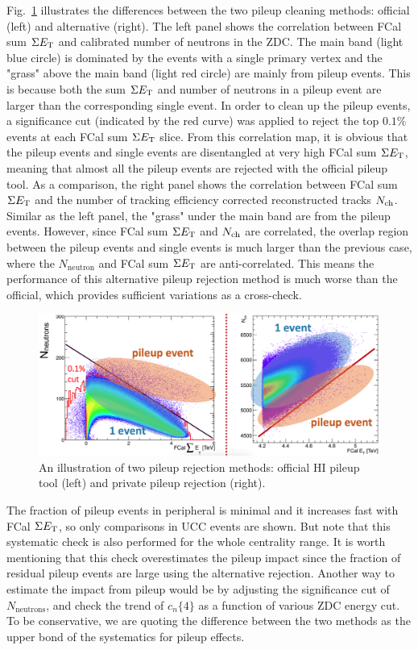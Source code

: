 Fig.~\ref{fig:appendix_pileup_eg} illustrates the differences between the two pileup cleaning methods: official (left) and alternative (right). The left panel shows the correlation between FCal sum $\Sigma E_\text{T}$ and calibrated number of neutrons in the ZDC. The main band (light blue circle) is dominated by the events with a single primary vertex and the "grass" above the main band (light red circle) are mainly from pileup events. This is because both the sum $\Sigma E_\text{T}$ and number of neutrons in a pileup event are larger than the corresponding single event. In order to clean up the pileup events, a significance cut (indicated by the red curve) was applied to reject the top $0.1\%$ events at each FCal sum $\Sigma E_\text{T}$ slice. From this correlation map, it is obvious that the pileup events and single events are disentangled at very high FCal sum $\Sigma E_\text{T}$, meaning that almost all the pileup events are rejected with the official pileup tool. As a comparison, the right panel shows the correlation between FCal sum $\Sigma E_\text{T}$ and the number of tracking efficiency corrected reconstructed tracks $N_\text{ch}$. Similar as the left panel, the "grass" under the main band are from the pileup events. However, since FCal sum $\Sigma E_\text{T}$ and $N_\text{ch}$ are correlated, the overlap region between the pileup events and single events is much larger than the previous case, where the $N_\text{neutron}$ and FCal sum $\Sigma E_\text{T}$ are anti-correlated. This means the performance of this alternative pileup rejection method is much worse than the official, which provides sufficient variations as a cross-check.
\begin{figure}[H]
\centering
\includegraphics[width=.9\linewidth]{figs/chapter_appendix/pileup_eg.png}
\caption{An illustration of two pileup rejection methods: official HI pileup tool (left) and private pileup rejection (right).}
\label{fig:appendix_pileup_eg}
\end{figure}

The fraction of pileup events in peripheral is minimal and it increases fast with FCal $\Sigma E_\text{T}$, so only comparisons in UCC events are shown. But note that this systematic check is also performed for the whole centrality range. It is worth mentioning that this check overestimates the pileup impact since the fraction of residual pileup events are large using the alternative rejection. Another way to estimate the impact from pileup would be by adjusting the significance cut of $N_\text{neutrons}$, and check the trend of $c_n\{4\}$ as a function of various ZDC energy cut. To be conservative, we are quoting the difference between the two methods as the upper bond of the systematics for pileup effects.

